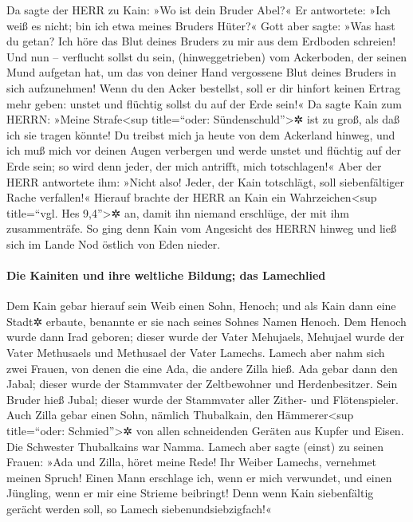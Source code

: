  Da sagte der HERR zu Kain: »Wo ist dein Bruder Abel?« Er
antwortete: »Ich weiß es nicht; bin ich etwa meines Bruders Hüter?«
 Gott aber sagte: »Was hast du getan? Ich höre das Blut
deines Bruders zu mir aus dem Erdboden schreien!  Und nun
-- verflucht sollst du sein, (hinweggetrieben) vom Ackerboden, der
seinen Mund aufgetan hat, um das von deiner Hand vergossene Blut deines
Bruders in sich aufzunehmen!  Wenn du den Acker
bestellst, soll er dir hinfort keinen Ertrag mehr geben: unstet und
flüchtig sollst du auf der Erde sein!«  Da sagte Kain zum
HERRN: »Meine Strafe\textless sup title=``oder:
Sündenschuld''\textgreater✲ ist zu groß, als daß ich sie tragen könnte!
 Du treibst mich ja heute von dem Ackerland hinweg, und
ich muß mich vor deinen Augen verbergen und werde unstet und flüchtig
auf der Erde sein; so wird denn jeder, der mich antrifft, mich
totschlagen!«  Aber der HERR antwortete ihm: »Nicht also!
Jeder, der Kain totschlägt, soll siebenfältiger Rache verfallen!«
Hierauf brachte der HERR an Kain ein Wahrzeichen\textless sup
title=``vgl. Hes 9,4''\textgreater✲ an, damit ihn niemand erschlüge, der
mit ihm zusammenträfe.  So ging denn Kain vom Angesicht
des HERRN hinweg und ließ sich im Lande Nod östlich von Eden nieder.

\hypertarget{die-kainiten-und-ihre-weltliche-bildung-das-lamechlied}{%
\paragraph{Die Kainiten und ihre weltliche Bildung; das
Lamechlied}\label{die-kainiten-und-ihre-weltliche-bildung-das-lamechlied}}

 Dem Kain gebar hierauf sein Weib einen Sohn, Henoch; und
als Kain dann eine Stadt✲ erbaute, benannte er sie nach seines Sohnes
Namen Henoch.  Dem Henoch wurde dann Irad geboren; dieser
wurde der Vater Mehujaels, Mehujael wurde der Vater Methusaels und
Methusael der Vater Lamechs.  Lamech aber nahm sich zwei
Frauen, von denen die eine Ada, die andere Zilla hieß. 
Ada gebar dann den Jabal; dieser wurde der Stammvater der Zeltbewohner
und Herdenbesitzer.  Sein Bruder hieß Jubal; dieser wurde
der Stammvater aller Zither- und Flötenspieler.  Auch
Zilla gebar einen Sohn, nämlich Thubalkain, den Hämmerer\textless sup
title=``oder: Schmied''\textgreater✲ von allen schneidenden Geräten aus
Kupfer und Eisen. Die Schwester Thubalkains war Namma. 
Lamech aber sagte (einst) zu seinen Frauen: »Ada und Zilla, höret meine
Rede! Ihr Weiber Lamechs, vernehmet meinen Spruch! Einen Mann erschlage
ich, wenn er mich verwundet, und einen Jüngling, wenn er mir eine
Strieme beibringt!  Denn wenn Kain siebenfältig gerächt
werden soll, so Lamech siebenundsiebzigfach!«

